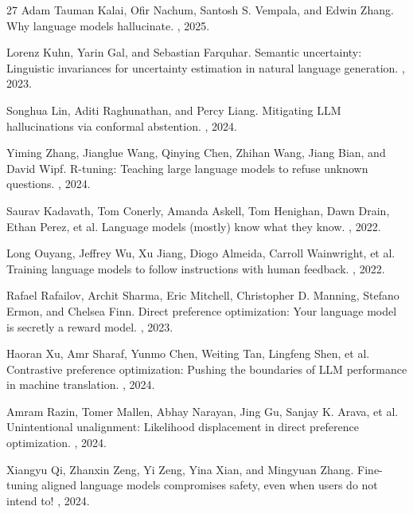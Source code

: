 \documentclass[11pt]{article}
\begin{document}
\begin{thebibliography}{27}
Adam Tauman Kalai, Ofir Nachum, Santosh S. Vempala, and Edwin Zhang.
\newblock Why language models hallucinate.
, 2025.

Lorenz Kuhn, Yarin Gal, and Sebastian Farquhar.
\newblock Semantic uncertainty: Linguistic invariances for uncertainty estimation in natural language generation.
, 2023.

Songhua Lin, Aditi Raghunathan, and Percy Liang.
\newblock Mitigating {LLM} hallucinations via conformal abstention.
, 2024.

Yiming Zhang, Jianglue Wang, Qinying Chen, Zhihan Wang, Jiang Bian, and David Wipf.
\newblock R-tuning: Teaching large language models to refuse unknown questions.
, 2024.

Saurav Kadavath, Tom Conerly, Amanda Askell, Tom Henighan, Dawn Drain, Ethan Perez, et al.
\newblock Language models (mostly) know what they know.
, 2022.

Long Ouyang, Jeffrey Wu, Xu Jiang, Diogo Almeida, Carroll Wainwright, et al.
\newblock Training language models to follow instructions with human feedback.
, 2022.

Rafael Rafailov, Archit Sharma, Eric Mitchell, Christopher D. Manning, Stefano Ermon, and Chelsea Finn.
\newblock Direct preference optimization: Your language model is secretly a reward model.
, 2023.

Haoran Xu, Amr Sharaf, Yunmo Chen, Weiting Tan, Lingfeng Shen, et al.
\newblock Contrastive preference optimization: Pushing the boundaries of {LLM} performance in machine translation.
, 2024.

Amram Razin, Tomer Mallen, Abhay Narayan, Jing Gu, Sanjay K. Arava, et al.
\newblock Unintentional unalignment: Likelihood displacement in direct preference optimization.
, 2024.

Xiangyu Qi, Zhanxin Zeng, Yi Zeng, Yina Xian, and Mingyuan Zhang.
\newblock Fine-tuning aligned language models compromises safety, even when users do not intend to!
, 2024.


\end{thebibliography}
\end{document}
